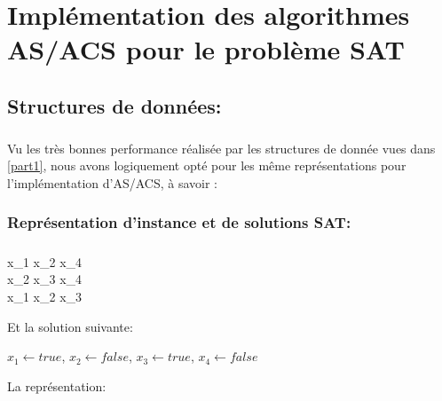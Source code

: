 \chapter{Implémentation des algorithmes AS/ACS pour le problème SAT}
	\section{Structures de données:}
	\paragraph{}
	Vu les très bonnes performance réalisée par les structures de donnée vues dans \ref{part1}, nous avons logiquement opté pour les même représentations pour l'implémentation d'AS/ACS, à savoir : 
	\subsection{Représentation d’instance et de solutions SAT:}
	\paragraph{}
	\begin{flalign*}
	x_{1} \lor \neg x_{2} \lor x_{4} \\
	\neg x_{2} \lor x_{3} \lor x_{4} \\
	\neg x_{1} \lor x_{2} \lor \neg x_{3}
	\end{flalign*}
	Et la solution suivante:\\
	\begin{center}
		$x_{1} \leftarrow true$, $x_{2} \leftarrow false$, $x_{3} \leftarrow true$, $x_{4} \leftarrow false $
	\end{center}
	
	La représentation:\\
	
